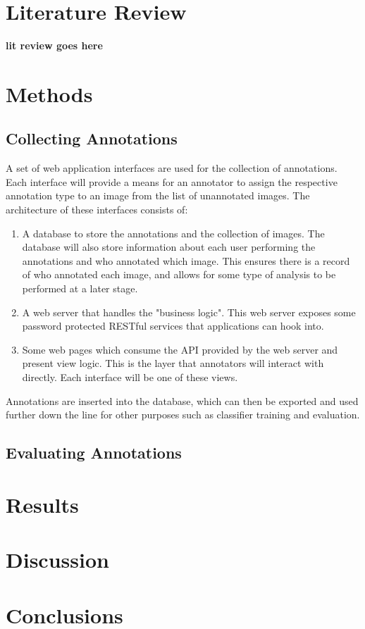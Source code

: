 \documentclass[12pt,a4paper]{article}
\begin{document}
\section{Literature Review}

\textbf{lit review goes here}

\section{Methods}

\subsection{Collecting Annotations}

A set of web application interfaces are used for the collection of annotations. Each interface will provide a means for an annotator to assign the respective annotation type to an image from the list of unannotated images. The architecture of these interfaces consists of:
\begin{enumerate}
    \item A database to store the annotations and the collection of images. The database will also store information about each user performing the annotations and who annotated which image. This ensures there is a record of who annotated each image, and allows for some type of analysis to be performed at a later stage.
    \item A web server that handles the "business logic". This web server exposes some password protected RESTful services that applications can hook into.
    \item Some web pages which consume the API provided by the web server and present view logic. This is the layer that annotators will interact with directly. Each interface will be one of these views.
\end{enumerate}

Annotations are inserted into the database, which can then be exported and used further down the line for other purposes such as  classifier training and evaluation. 

\subsection{Evaluating Annotations}

\section{Results}

\section{Discussion}

\section{Conclusions}



\end{document}
